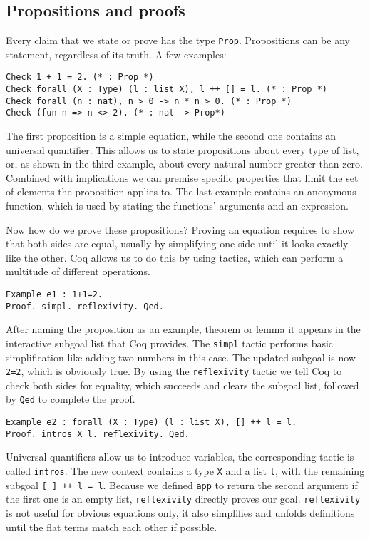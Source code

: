 \documentclass[fleqn]{scrreprt}
\newcommand{\todo}[1]{\marginpar{\textbf{TODO:} #1}}
\newcommand{\coqinline}[1]{\texttt{#1}}
\begin{document}
\subsection{Propositions and proofs}
Every claim that we state or prove has the type \coqinline{Prop}. Propositions can be any statement, regardless of its truth. A few examples:
\begin{verbatim}
Check 1 + 1 = 2. (* : Prop *)
Check forall (X : Type) (l : list X), l ++ [] = l. (* : Prop *)
Check forall (n : nat), n > 0 -> n * n > 0. (* : Prop *)
Check (fun n => n <> 2). (* : nat -> Prop*)
\end{verbatim}
The first proposition is a simple equation, while the second one contains an universal quantifier. This allows us to state propositions about every type of list, or, as shown in the third example, about every natural number greater than zero. Combined with implications we can premise specific properties that limit the set of elements the proposition applies to. The last example contains an anonymous function, which is used by stating the functions' arguments and an expression.
\par
Now how do we prove these propositions? Proving an equation requires to show that both sides are equal, usually by simplifying one side until it looks exactly like the other. Coq allows us to do this by using tactics, which can perform a multitude of different operations.
\begin{verbatim}
Example e1 : 1+1=2.
Proof. simpl. reflexivity. Qed. 
\end{verbatim} 
\todo{Highlighting für Proof und Qed}
After naming the proposition as an example, theorem or lemma it appears in the interactive subgoal list that Coq provides. The \coqinline{simpl} tactic performs basic simplification like adding two numbers in this case. The updated subgoal is now \coqinline{2=2}, which is obviously true. By using the \coqinline{reflexivity} tactic we tell Coq to check both sides for equality, which succeeds and clears the subgoal list, followed by \coqinline{Qed} to complete the proof.
\begin{verbatim}
Example e2 : forall (X : Type) (l : list X), [] ++ l = l.
Proof. intros X l. reflexivity. Qed.
\end{verbatim}
Universal quantifiers allow us to introduce variables, the corresponding tactic is called \coqinline{intros}. The new context contains a type \coqinline{X} and a list \coqinline{l}, with the remaining subgoal \coqinline{[ ] ++ l = l}. Because we defined \coqinline{app} to return the second argument if the first one is an empty list, \coqinline{reflexivity} directly proves our goal. \coqinline{reflexivity} is not useful for obvious equations only, it also simplifies and unfolds definitions until the flat terms match each other if possible.
\end{document}
